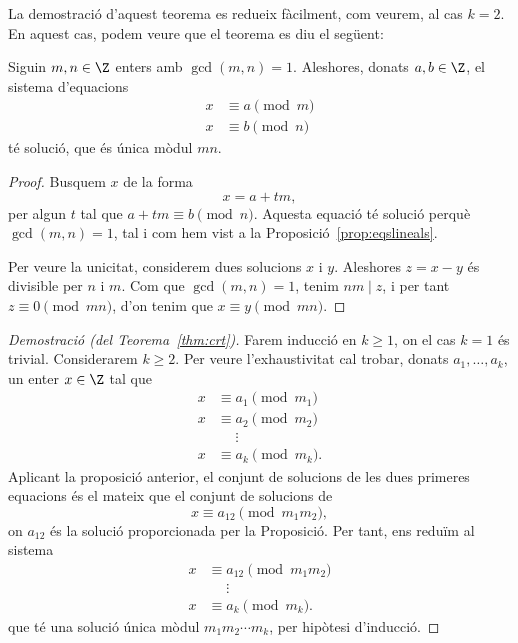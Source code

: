   La demostració d'aquest teorema es redueix fàcilment, com veurem, al cas $k=2$. En aquest cas, podem veure que el teorema es diu el següent:
  \begin{proposition}
   Siguin $m,n\in\Z$ enters amb $\gcd(m,n)=1$. Aleshores, donats $a,b\in \Z$, el sistema d'equacions
   \begin{align*}
   x&\equiv a\pmod{m}\\
   x&\equiv b\pmod{n}
   \end{align*}
   té solució, que és única mòdul $mn$.
  \end{proposition}
  \begin{proof}
  Busquem $x$ de la forma
  \[
  x = a+tm,
  \]
  per algun $t$ tal que $a+tm\equiv b\pmod{n}$. Aquesta equació té solució perquè $\gcd(m,n)=1$, tal i com hem vist a la Proposició~\ref{prop:eqslineals}.
  
  Per veure la unicitat, considerem dues solucions $x$ i $y$. Aleshores $z=x-y$ és divisible per $n$ i $m$. Com que $\gcd(m,n)=1$, tenim $nm\mid z$, i per tant $z\equiv 0\pmod{mn}$, d'on tenim que $x\equiv y\pmod{mn}$.
  \end{proof}

  \begin{proof}[Demostració (del Teorema~\ref{thm:crt})]
   Farem inducció en $k\geq 1$, on el cas $k=1$ és trivial. Considerarem $k\geq 2$. Per veure l'exhaustivitat cal trobar, donats $a_1,\ldots,a_k$, un enter $x\in\Z$ tal que
   \begin{align*}
   x&\equiv a_1\pmod{m_1}\\
   x&\equiv a_2\pmod{m_2}\\
   \phantom{x}&\phantom{\equiv}\vdots\\
   x&\equiv a_k\pmod{m_k}.
   \end{align*}
   Aplicant la proposició anterior,
   el conjunt de solucions de les dues primeres equacions és el mateix que el conjunt de solucions de
   \[
   x\equiv a_{12}\pmod{m_1m_2},
   \]
   on $a_{12}$ és la solució proporcionada per la Proposició. Per tant, ens reduïm al sistema
    \begin{align*}
   x&\equiv a_{12}\pmod{m_1m_2}\\
   \phantom{x}&\phantom{\equiv}\vdots\\
   x&\equiv a_k\pmod{m_k}.
   \end{align*}
  que té una solució única mòdul $m_1m_2\cdots m_k$, per hipòtesi d'inducció.
  \end{proof}
 
